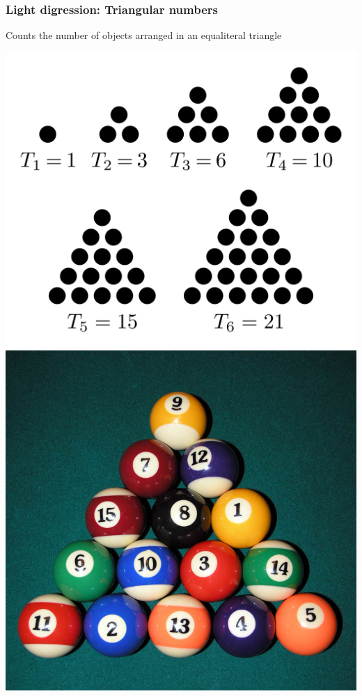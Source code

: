 \documentclass{beamer}
\begin{document}
\begin{frame}
\frametitle{Light digression: Triangular numbers}

 Counts the number of objects arranged in an equaliteral triangle
 \begin{center}
 \begin{multicols}{2}
 \includegraphics[scale=0.10]{triangular_numbers.png}
 \columnbreak
 \includegraphics[scale=0.15]{pool.jpg}
 \end{multicols}
\end{center}
\end{frame}
\end{document}
